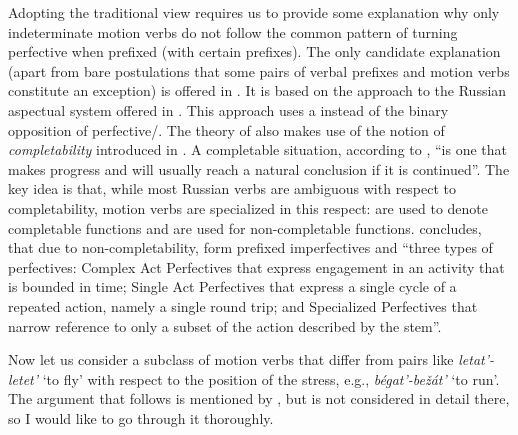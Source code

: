 Adopting the traditional view requires us to provide some explanation why only indeterminate motion verbs do not follow the common pattern of turning perfective when prefixed (with certain prefixes). The only candidate explanation (apart from bare postulations that some pairs of verbal prefixes and motion verbs constitute an exception) is offered in \citealt{Janda:10}. It is based on the approach to the Russian aspectual system offered in \citealt{Janda:07a}. This approach uses a  instead of the binary opposition of perfective/. The theory of \citet{Janda:10} also makes use of the notion of \textit{completability} introduced in \citealt{Janda:07a}. A completable situation, according to \citet[129]{Janda:10}, ``is one that makes progress and will usually reach a natural conclusion if it is continued''. The key idea is that, while most Russian verbs are ambiguous with respect to completability, motion verbs are specialized in this respect:  are used to denote completable functions and  are used for non-completable functions. \citet[138]{Janda:10} concludes, that due to non-completability,  form prefixed imperfectives and ``three types of perfectives: Complex Act Perfectives that express engagement in an activity that is bounded in time; Single Act Perfectives that express a single cycle of a repeated action, namely a single round trip; and Specialized Perfectives that narrow reference to only a subset of the action described by the stem''.

Now let us consider a subclass of motion verbs that differ from pairs like \textit{letat'\textsubscript{\INDET}-letet'\textsubscript{\DET}} `to fly' with respect to the position of the stress, e.g., \textit{b\'{e}gat'\textsubscript{\INDET}-be\v{z}\'{a}t'\textsubscript{\DET}} `to run'. The argument that follows is mentioned by \citet{Isachenko:60}, but is not considered in detail there, so I would like to go through it thoroughly. 

